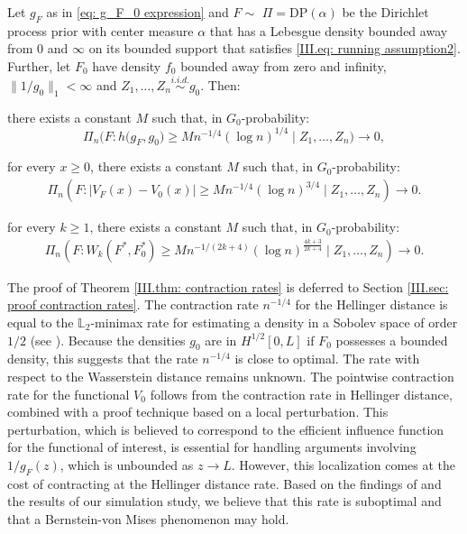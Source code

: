\begin{theorem}\label{III.thm: contraction rates}
    Let $g_{\scriptscriptstyle{F}}$ as in \eqref{eq: g_F_0 expression} and $F \sim  \, \, \Pi  = \mathrm{DP} (\alpha)$ be the Dirichlet process prior with center measure $\alpha$ that has a Lebesgue density bounded away from 0 and $\infty$ on its bounded support that satisfies \eqref{III.eq: running assumption2}. Further, let $F_0$ have density $f_0$ bounded away from zero and infinity,  $\| 1/ g_0 \|_1 < \infty$ and $Z_1,\ldots,Z_n \stackrel{i.i.d.}{\sim} g_0$. Then:
    \begin{thmlist}
        \item there exists a constant $M$ such that, in $G_0$-probability: \label{III.thm: contraction rate hellinger}
        $$
            \Pi_n\Big(F: h\big(g_{\scriptscriptstyle{F}}, g_0 \big) \geq M n^{-1 / 4} (\log n)^{1/4} \mid Z_1, \ldots, Z_n\Big) \rightarrow 0,
        $$
        \item for every $x \geq 0$, there exists a constant $M$ such that, in $G_0$-probability:\label{III.thm: contraction rate V}
        \begin{align*}
            \Pi_n\left(F : |V_{\scriptscriptstyle{F}}(x) - V_0(x)| \geq M n^{-1 / 4} (\log n)^{3/4} \mid Z_1, \ldots, Z_n\right) \rightarrow 0.
        \end{align*}
        \item for every $k \geq 1$, there exists a constant $M$ such that, in $G_0$-probability:\label{III.thm: contraction rate F}
        \begin{align*}
            \Pi_n\left(F : W_k\left(F^*, F^*_0\right) \geq M  n^{-1 /(2 k + 4)}(\log n)^{\frac{4k +3}{2k+4}} \mid Z_1, \ldots, Z_n\right) \rightarrow 0.
        \end{align*}
    \end{thmlist}
     
\end{theorem}

The proof of Theorem \ref{III.thm: contraction rates} is deferred to Section \ref{III.sec: proof contraction rates}. The contraction rate $n^{-1/4}$ for the Hellinger distance is equal to the $\mathbb{L}_2$-minimax rate for estimating a density in a Sobolev space of order $1/2$ (see \cite{45}). Because the densities $g_0$ are in $H^{1/2}[0,L]$ if $F_0$ possesses a bounded density, this suggests that the rate  $n^{-1/4}$ is close to optimal. The rate with respect to the Wasserstein distance remains unknown. The pointwise contraction rate for the functional \( V_0 \) follows from the contraction rate in Hellinger distance, combined with a proof technique based on a local perturbation. This perturbation, which is believed to correspond to the efficient influence function for the functional of interest, is essential for handling arguments involving \( 1/g_{\scriptscriptstyle{F}} (z)\), which is unbounded as $z \to L$. However, this localization comes at the cost of contracting at the Hellinger distance rate. Based on the findings of \cite{51} and the results of our simulation study, we believe that this rate is suboptimal and that a Bernstein-von Mises phenomenon may hold.


